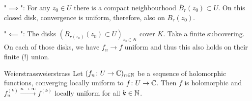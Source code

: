 \documentclass[a4paper,english]{article}
\begin{document}
\begin{pr}
    "$\implies$":
    For any $z_0 \in U$ there is a compact neighbourhood $\overline{B}_r(z_0) \subset U$.
    On this closed disk, convergence is uniform, therefore, also on $B_r(z_0)$.
    
    "$\impliedby$":
    The disks $(B_{r(z_0)}(z_0) \subset U)_{z_0 \in K}$ cover $K$.
    Take a finite subcovering.
    On each of those disks, we have $f_n \to f$ uniform and thus this also holds on their finite (!) union.
\end{pr}

\begin{thm}{Weierstrass}{weierstrass}
    Let $(f_n \colon U \to \operatorname{\mathbb{C}})_{n \in \operatorname{\mathbb{N}}}$ be a sequence of holomorphic functions, converging locally uniform to $f \colon U \to \operatorname{\mathbb{C}}$.
    Then $f$ is holomorphic and $f_n^{(k)} \xrightarrow{n \to \infty} f^{(k)}$ locally uniform for all $k \in \operatorname{\mathbb{N}}$.
\end{thm}
\end{document}
